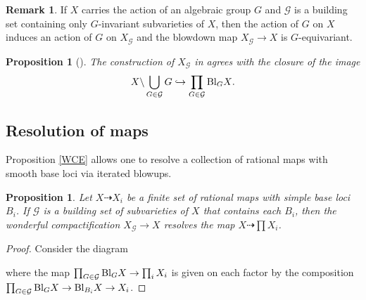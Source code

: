\documentclass[12pt]{amsart}
\newcommand{\mc}{\mathcal}
\theoremstyle{plain}
\newtheorem{Prop}[Thm]{Proposition}
\theoremstyle{definition}
\newtheorem{Rem}[Thm]{Remark}
\theoremstyle{remark}
\begin{document}
\begin{Rem}\label{equivariantblowup}
If $X$ carries the action of an algebraic group $G$ and $\mc{G}$ is a building set containing only $G$-invariant subvarieties of $X$, then the action of $G$ on $X$ induces an action of $G$ on $X_\mc{G}$ and the blowdown map $X_{\mc{G}} \to X$ is $G$-equivariant.
\end{Rem}

\begin{Prop}
[{\cite[Proposition 2.13]{LiLi}}] \label{wonderfulcompactificationclosure}
\label{WCE}
The construction of $X_{\mc{G}}$ in  agrees with the closure of the image
\begin{align*}
X\backslash\bigcup_{G\in \mc{G}}G\hookrightarrow \prod_{G\in\mc{G}}{{\rm Bl}_GX}.
\end{align*}
\end{Prop}

\subsection{Resolution of maps}
Proposition \ref{WCE} allows one to resolve a collection of rational maps with smooth base loci via iterated blowups.
\begin{Prop}
\label{RMBU}
Let $X\dashrightarrow X_i$ be a finite set of rational maps with simple base loci $B_i$. If $\mc{G}$ is a building set of subvarieties of $X$ that contains each $B_i$, then the wonderful compactification $X_{\mc{G}}\to X$ resolves the map $X\dashrightarrow \prod X_i$.
\end{Prop}

\begin{proof}
Consider the diagram
\begin{center}
\end{center}
where the map $\prod_{G\in \mc{G}}{{\rm Bl}_{G}X}\to \prod_{i}{X_i}$ is given on each factor by the composition $\prod_{G\in \mc{G}}{{\rm Bl}_{G}X}\to {\rm Bl}_{B_i}X\to X_i$.
\end{proof}
\end{document}
